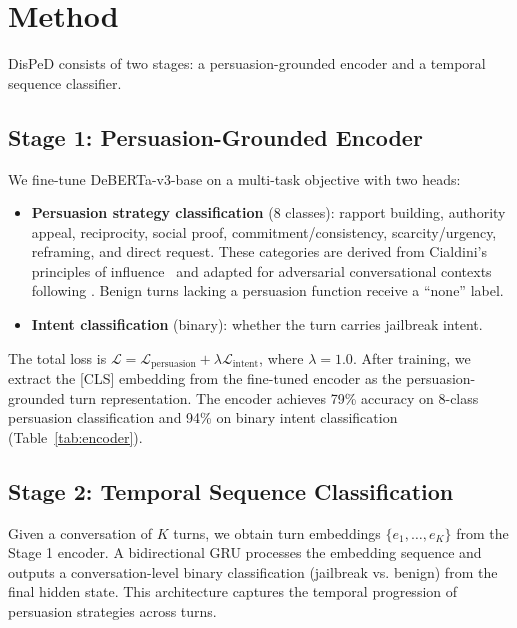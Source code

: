 \documentclass[11pt,a4paper]{article}
\begin{document}
\section{Method}
\label{sec:method}

DisPeD consists of two stages: a persuasion-grounded encoder and a temporal sequence classifier.

\subsection{Stage 1: Persuasion-Grounded Encoder}

We fine-tune DeBERTa-v3-base on a multi-task objective with two heads:

\begin{itemize}
    \item \textbf{Persuasion strategy classification} (8 classes): rapport building, authority appeal, reciprocity, social proof, commitment/consistency, scarcity/urgency, reframing, and direct request. These categories are derived from Cialdini's principles of influence~\citep{cialdini2001science} and adapted for adversarial conversational contexts following \citet{zeng2024persuasion}. Benign turns lacking a persuasion function receive a ``none'' label.
    \item \textbf{Intent classification} (binary): whether the turn carries jailbreak intent.
\end{itemize}

The total loss is $\mathcal{L} = \mathcal{L}_{\text{persuasion}} + \lambda \mathcal{L}_{\text{intent}}$, where $\lambda = 1.0$. After training, we extract the [CLS] embedding from the fine-tuned encoder as the persuasion-grounded turn representation. The encoder achieves 79\% accuracy on 8-class persuasion classification and 94\% on binary intent classification (Table~\ref{tab:encoder}).

\subsection{Stage 2: Temporal Sequence Classification}

Given a conversation of $K$ turns, we obtain turn embeddings $\{e_1, \ldots, e_K\}$ from the Stage 1 encoder. A bidirectional GRU processes the embedding sequence and outputs a conversation-level binary classification (jailbreak vs. benign) from the final hidden state. This architecture captures the temporal progression of persuasion strategies across turns.
\end{document}
